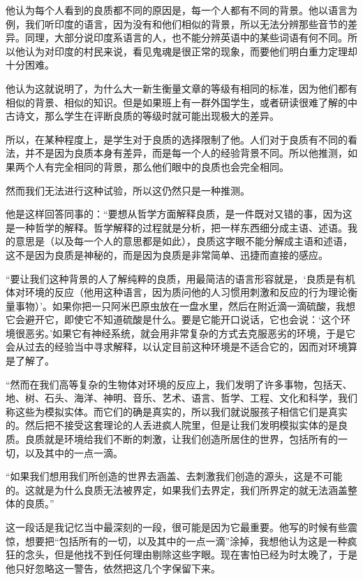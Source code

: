 \documentclass[UTF8]{article}
\begin{document}
\par 他认为每个人看到的良质都不同的原因是，每一个人都有不同的背景。他以语言为例，我们听印度的语言，因为没有和他们相似的背景，所以无法分辨那些音节的差异。同理，大部分说印度系语言的人，也不能分辨英语中的某些词语有何不同。所以他认为对印度的村民来说，看见鬼魂是很正常的现象，而要他们明白重力定理却十分困难。
\par 他认为这就说明了，为什么大一新生衡量文章的等级有相同的标准，因为他们都有相似的背景、相似的知识。但是如果班上有一群外国学生，或者研读很难了解的中古诗文，那么学生在评断良质的等级时就可能出现极大的差异。
\par 所以，在某种程度上，是学生对于良质的选择限制了他。人们对于良质有不同的看法，并不是因为良质本身有差异，而是每一个人的经验背景不同。所以他推测，如果两个人有完全相同的背景，那么他们眼中的良质也会完全相同。
\par 然而我们无法进行这种试验，所以这仍然只是一种推测。
\par 他是这样回答同事的：“要想从哲学方面解释良质，是一件既对又错的事，因为这是一种哲学的解释。哲学解释的过程就是分析，把一样东西细分成主语、述语。我的意思是（以及每一个人的意思都是如此），良质这字眼不能分解成主语和述语，这不是因为良质是神秘的，而是因为良质是非常简单、迅捷而直接的感应。
\par “要让我们这种背景的人了解纯粹的良质，用最简洁的语言形容就是，‘良质是有机体对环境的反应（他用这种语言，因为质问他的人习惯用刺激和反应的行为理论衡量事物）’。如果你把一只阿米巴原虫放在一盘水里，然后在附近滴一滴硫酸，我想它会避开它，即使它不知道硫酸是什么。要是它能开口说话，它也会说：‘这个环境很恶劣。’如果它有神经系统，就会用非常复杂的方式去克服恶劣的环境，于是它会从过去的经验当中寻求解释，以认定目前这种环境是不适合它的，因而对环境算是了解了。
\par “然而在我们高等复杂的生物体对环境的反应上，我们发明了许多事物，包括天、地、树、石头、海洋、神明、音乐、艺术、语言、哲学、工程、文化和科学，我们称这些为模拟实体。而它们的确是真实的，所以我们就说服孩子相信它们是真实的。然后把不接受这套理论的人丢进疯人院里，但是让我们发明模拟实体的是良质。良质就是环境给我们不断的刺激，让我们创造所居住的世界，包括所有的一切，以及其中的一点一滴。
\par “如果我们想用我们所创造的世界去涵盖、去刺激我们创造的源头，这是不可能的。这就是为什么良质无法被界定，如果我们去界定，我们所界定的就无法涵盖整体的良质。”
\par 这一段话是我记忆当中最深刻的一段，很可能是因为它最重要。他写的时候有些震惊，想要把“包括所有的一切，以及其中的一点一滴”涂掉，我想他认为这是一种疯狂的念头，但是他找不到任何理由剔除这些字眼。现在害怕已经为时太晚了，于是他只好忽略这一警告，依然把这几个字保留下来。
\end{document}
